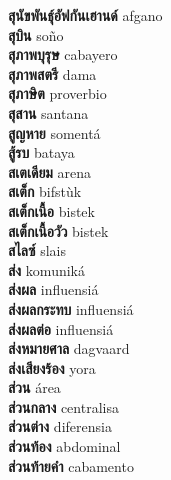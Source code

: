 \textbf{ สุนัขพันธุ์อัฟกันเฮานด์  } afgano \\
\textbf{ สุบิน  } soño \\
\textbf{ สุภาพบุรุษ  } cabayero \\
\textbf{ สุภาพสตรี  } dama \\
\textbf{ สุภาษิต  } proverbio \\
\textbf{ สุสาน  } santana \\
\textbf{ สูญหาย  } somentá \\
\textbf{ สู้รบ  } bataya \\
\textbf{ สเตเดียม  } arena \\
\textbf{ สเต็ก  } bifstùk \\
\textbf{ สเต็กเนื้อ  } bistek \\
\textbf{ สเต็กเนื้อวัว  } bistek \\
\textbf{ สไลซ์  } slais \\
\textbf{ ส่ง  } komuniká \\
\textbf{ ส่งผล  } influensiá \\
\textbf{ ส่งผลกระทบ  } influensiá \\
\textbf{ ส่งผลต่อ  } influensiá \\
\textbf{ ส่งหมายศาล  } dagvaard \\
\textbf{ ส่งเสียงร้อง  } yora \\
\textbf{ ส่วน  } área \\
\textbf{ ส่วนกลาง  } centralisa \\
\textbf{ ส่วนต่าง  } diferensia \\
\textbf{ ส่วนท้อง  } abdominal \\
\textbf{ ส่วนท้ายคำ  } cabamento \\
